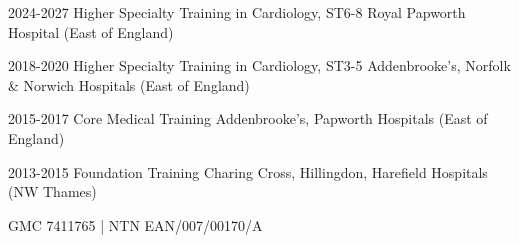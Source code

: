 
\begin{cvskills}

  \cvskill
    {2024-2027} %
    {Higher Specialty Training in Cardiology, ST6-8} %
    {Royal Papworth Hospital (East of England)} %

  \cvskill
    {2018-2020} %
    {Higher Specialty Training in Cardiology, ST3-5} %
    {Addenbrooke's, Norfolk \& Norwich Hospitals (East of England)} %

  \cvskill
    {2015-2017} %
    {Core Medical Training} %
    {Addenbrooke's, Papworth Hospitals (East of England)} %

  \cvskill
    {2013-2015} %
    {Foundation Training} %
    {Charing Cross, Hillingdon, Harefield Hospitals (NW Thames)} %

\end{cvskills}
{\footnotesize \hfill GMC 7411765 | NTN EAN/007/00170/A}

